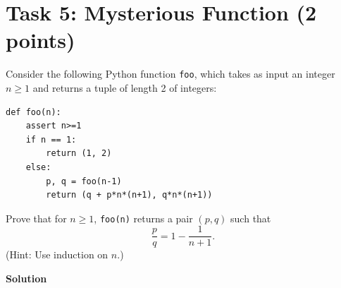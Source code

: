 \documentclass{article}
\newcommand{\solution}{\textbf{\large Solution}}
\theoremstyle{remark}
\begin{document}
\section*{Task 5: Mysterious Function (2 points)}

Consider the following Python function \texttt{foo}, which takes as input an integer $n \ge 1$ and returns a tuple of length 2 of integers:
\begin{verbatim}
def foo(n):
    assert n>=1
    if n == 1:
        return (1, 2)
    else:
        p, q = foo(n-1)
        return (q + p*n*(n+1), q*n*(n+1))
\end{verbatim}

Prove that for $n \ge 1$, \texttt{foo(n)} returns a pair $(p, q)$ such that
\[
    \frac{p}{q} = 1 - \frac{1}{n + 1}.
\]
(Hint: Use induction on $n$.)

\medskip
\solution
\end{document}
